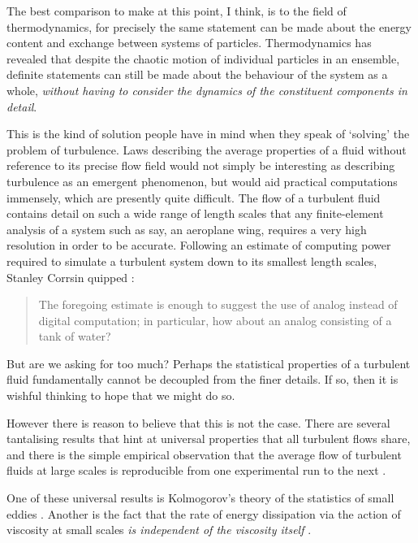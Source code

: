 The best comparison to make at this point, I think, is to the field of thermodynamics, for precisely the same statement can be made about the energy content and exchange between systems of particles. Thermodynamics has revealed that despite the chaotic motion of individual particles in an ensemble, definite statements can still be made about the behaviour of the system as a whole, \emph{without having to consider the dynamics of the constituent components in detail}.

This is the kind of solution people have in mind when they speak of `solving' the problem of turbulence. Laws describing the average properties of a fluid without reference to its precise flow field would not simply be interesting as describing turbulence as an emergent phenomenon, but would aid practical computations immensely, which are presently quite difficult. The flow of a turbulent fluid contains detail on such a  wide range of length scales that any finite-element analysis of a system such as say, an aeroplane wing, requires a very high resolution in order to be accurate. Following an estimate of computing power required to simulate a turbulent system down to its smallest length scales, Stanley Corrsin quipped \cite{corrsin_turbulent_1961}:
\begin{quote}
The foregoing estimate  is enough to suggest the use of analog instead of digital  computation; in particular, how about an analog consisting of a tank of water?
\end{quote}

But are we asking for too much? Perhaps the statistical properties of a turbulent fluid fundamentally cannot be decoupled from the finer details. If so, then it is wishful thinking to hope that we might do so.

However there is reason to believe that this is not the case. There are several tantalising results that hint at universal properties that all turbulent flows share, and there is the simple empirical observation that the average flow of turbulent fluids at large scales is reproducible from one experimental run to the next \cite[pp 13, 86]{davidson_turbulence:_2004}.

One of these universal results is Kolmogorov's theory of the statistics of small eddies \cite{kolmogorov_local_1941, spalding_kolmogorovs_1991}. Another is the fact that the rate of energy dissipation via the action of viscosity at small scales \emph{is independent of the viscosity itself} \cite[p 77]{davidson_turbulence:_2004}.

